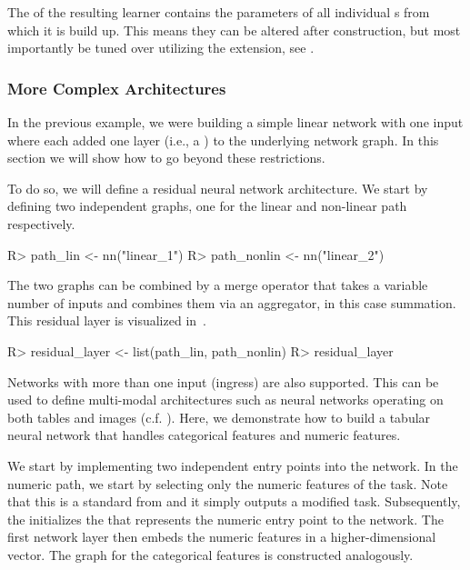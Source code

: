 \documentclass[article]{jss}
\theoremstyle{definition}
\begin{document}

The  of the resulting learner contains the parameters of all individual s from which it is build up.
This means they can be altered after construction, but most importantly be tuned over utilizing the  extension, see .

\subsubsection{More Complex Architectures}\label{sec:complex-architectures}

In the previous example, we were building a simple linear network with one input where each  added one layer (i.e., a ) to the underlying network graph.
In this section we will show how to go beyond these restrictions.

To do so, we will define a residual neural network architecture.
We start by defining two independent graphs, one for the linear and non-linear path respectively.

\begin{CodeInput}
R> path_lin <- nn("linear_1")
R> path_nonlin <- nn("linear_2") %
\end{CodeInput}

The two graphs can be combined by a merge operator that takes a variable number of inputs and combines them via an aggregator, in this case summation.
This residual layer is visualized in~.

\begin{CodeInput}
R> residual_layer <- list(path_lin, path_nonlin) %
R> residual_layer
\end{CodeInput}


Networks with more than one input (ingress) are also supported.
This can be used to define multi-modal architectures such as neural networks operating on both tables and images (c.f. ).
Here, we demonstrate how to build a tabular neural network that handles categorical features and numeric features.

We start by implementing two independent entry points into the network.
In the numeric path, we start by selecting only the numeric features of the task.
Note that this is a standard  from  and it simply outputs a modified task.
Subsequently, the  initializes the  that represents the numeric entry point to the network.
The first network layer then embeds the numeric features in a higher-dimensional vector.
The graph for the categorical features is constructed analogously.
\end{document}
